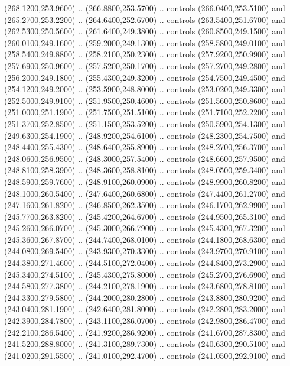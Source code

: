 {\begin{scope}[y=0.80pt, x=0.80pt, yscale=-1, xscale=1, inner sep=0pt, outer sep=0pt, #1]
      (268.1200,253.9600) .. (266.8800,253.5700) .. controls (266.0400,253.5100) and
      (265.2700,253.2200) .. (264.6400,252.6700) .. controls (263.5400,251.6700) and
      (262.5300,250.5600) .. (261.6400,249.3800) .. controls (260.8500,249.1500) and
      (260.0100,249.1600) .. (259.2000,249.1300) .. controls (258.5800,249.0100) and
      (258.5400,249.8800) .. (258.2100,250.2300) .. controls (257.9200,250.9900) and
      (257.6900,250.9600) .. (257.5200,250.1700) .. controls (257.2700,249.2800) and
      (256.2000,249.1800) .. (255.4300,249.3200) .. controls (254.7500,249.4500) and
      (254.1200,249.2000) .. (253.5900,248.8000) .. controls (253.0200,249.3300) and
      (252.5000,249.9100) .. (251.9500,250.4600) .. controls (251.5600,250.8600) and
      (251.0000,251.1900) .. (251.7500,251.5100) .. controls (251.7100,252.2200) and
      (251.3700,252.8500) .. (251.1500,253.5200) .. controls (250.5900,254.1300) and
      (249.6300,254.1900) .. (248.9200,254.6100) .. controls (248.2300,254.7500) and
      (248.4400,255.4300) .. (248.6400,255.8900) .. controls (248.2700,256.3700) and
      (248.0600,256.9500) .. (248.3000,257.5400) .. controls (248.6600,257.9500) and
      (248.8100,258.3900) .. (248.3600,258.8100) .. controls (248.0500,259.3400) and
      (248.5900,259.7600) .. (248.9100,260.0900) .. controls (248.9900,260.8200) and
      (248.1000,260.5400) .. (247.6400,260.6800) .. controls (247.4400,261.2700) and
      (247.1600,261.8200) .. (246.8500,262.3500) .. controls (246.1700,262.9900) and
      (245.7700,263.8200) .. (245.4200,264.6700) .. controls (244.9500,265.3100) and
      (245.2600,266.0700) .. (245.3000,266.7900) .. controls (245.4300,267.3200) and
      (245.3600,267.8700) .. (244.7400,268.0100) .. controls (244.1800,268.6300) and
      (244.0800,269.5400) .. (243.9300,270.3300) .. controls (243.9700,270.9100) and
      (244.3800,271.4600) .. (244.5100,272.0400) .. controls (244.8400,273.2900) and
      (245.3400,274.5100) .. (245.4300,275.8000) .. controls (245.2700,276.6900) and
      (244.5800,277.3800) .. (244.2100,278.1900) .. controls (243.6800,278.8100) and
      (244.3300,279.5800) .. (244.2000,280.2800) .. controls (243.8800,280.9200) and
      (243.0400,281.1900) .. (242.6400,281.8000) .. controls (242.2800,283.2000) and
      (242.3900,284.7800) .. (243.1100,286.0700) .. controls (242.9800,286.4700) and
      (242.2100,286.5400) .. (241.9200,286.9200) .. controls (241.6700,287.8300) and
      (241.5200,288.8000) .. (241.3100,289.7300) .. controls (240.6300,290.5100) and
      (241.0200,291.5500) .. (241.0100,292.4700) .. controls (241.0500,292.9100) and

\end{scope}}
